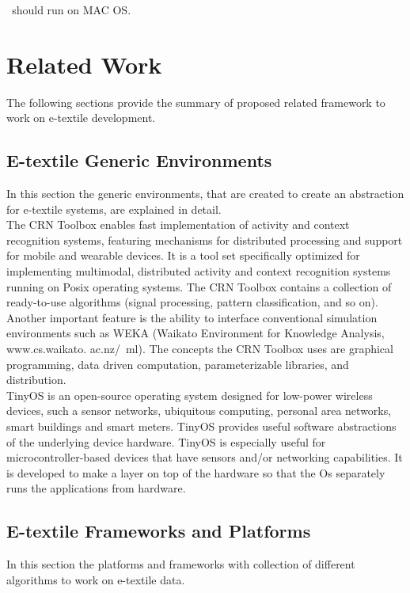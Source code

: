 \textit\ should run on MAC OS. 


\section{Related Work}

The following sections provide the summary of proposed related framework to work on e-textile development.

\subsection{E-textile Generic Environments}

In this section the generic environments, that are created to create an abstraction for e-textile systems, are explained in detail. \\ 

The CRN Toolbox enables fast implementation of activity and context recognition systems, featuring mechanisms for distributed processing and support for mobile and wearable devices. It is a tool set specifically optimized for implementing multimodal, distributed activity and context recognition systems running on Posix operating systems. The CRN Toolbox contains a collection of ready-to-use algorithms (signal processing, pattern classification, and so on). Another important feature is the ability to interface conventional simulation environments such as WEKA (Waikato Environment for Knowledge Analysis, www.cs.waikato. ac.nz/~ml). The concepts the CRN Toolbox uses are graphical programming, data driven computation, parameterizable libraries, and distribution. \\

TinyOS is an open-source operating system designed for low-power wireless devices, such a sensor networks, ubiquitous computing, personal area networks, smart buildings and smart meters. TinyOS provides useful software abstractions of the underlying device hardware. TinyOS is especially useful for microcontroller-based devices that have sensors and/or networking capabilities. It is developed to make a layer on top of the hardware so that the Os separately runs the applications from hardware.


\subsection{E-textile Frameworks and Platforms}
In this section the platforms and frameworks with collection of different algorithms to work on e-textile data.\\

